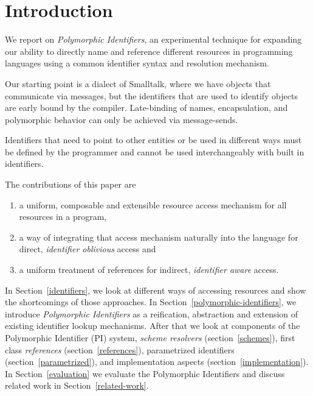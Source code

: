 \documentclass[preprint,authoryear]{llncs}
\newcommand\rh[1]{\mynote{Robert}{#1}}
\begin{document}

\section{Introduction}

\rh{experimental?}

We report on \emph{Polymorphic Identifiers}, an experimental
technique for expanding our ability to directly name and reference different 
resources
in programming languages using a common identifier syntax and resolution
mechanism.



Our starting point is a dialect of Smalltalk, where we have objects
that communicate via messages\cite{Goldberg1983}, but the identifiers that are used to identify 
objects are early bound by the compiler.  Late-binding of names, encapsulation,
and polymorphic behavior can only be achieved via message-sends.


Identifiers that need to point to other entities or be used in different ways must be defined
by the programmer and cannot be used interchangeably with built in identifiers.  

The contributions of this paper are
\begin{enumerate} 

\item a uniform, composable and extensible resource access mechanism for all
resources in a program, 
\item  a way of integrating that access mechanism naturally into the language for
direct, \emph{identifier oblivious} access and
\item a uniform treatment of references for indirect, \emph{identifier aware} access.
\end{enumerate}



In Section~\ref{identifiers}, we  look at different ways of accessing resources and show
the shortcomings of those approaches.  In Section~\ref{polymorphic-identifiers}, we 
introduce \emph{Polymorphic Identifiers} as a reification, abstraction and extension of existing 
identifier lookup mechanisms.  After that we look at components of the Polymorphic Identifier (PI)
system, \emph{scheme resolvers} (section~\ref{schemes}), first class \emph{references} (section~\ref{references}),
parametrized identifiers (section~\ref{parametrized}), and  implementation aspects (section~\ref{implementation}).
In Section~\ref{evaluation} we evaluate the Polymorphic Identifiers and discuss related work in Section~\ref{related-work}.
\end{document}
